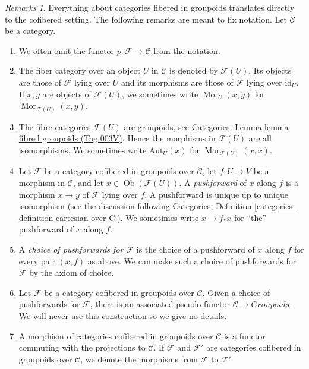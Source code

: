 \documentclass{amsart}
\theoremstyle{plain}
\theoremstyle{definition}
\theoremstyle{remark}
\newtheorem{remarks}[subsection]{Remarks}
\numberwithin{equation}{subsection}
\def\Mor{\mathop{\mathrm{Mor}}\nolimits}
\def\Ob{\mathop{\mathrm{Ob}}\nolimits}
\begin{document}
\begin{remarks}
\label{remarks-cofibered-groupoids}
Everything about categories fibered in groupoids translates directly to the
cofibered setting. The following remarks are meant to fix notation.
Let $\mathcal{C}$ be a category.
\begin{enumerate}
\item We often omit the functor $p: \mathcal{F} \to \mathcal{C}$ from the
notation.
\item The fiber category over an object $U$ in $\mathcal{C}$ is denoted by
$\mathcal{F}(U)$. Its objects are those of $\mathcal{F}$ lying over $U$ and its
morphisms are those of $\mathcal{F}$ lying over $\text{id}_U$.
If $x, y$  are objects of $\mathcal{F}(U)$, we sometimes write
$\Mor_U(x, y)$ for $\Mor_{\mathcal{F}(U)}(x, y)$.
\item The fibre categories $\mathcal{F}(U)$ are groupoids, see
Categories, Lemma \href{https://stacks.math.columbia.edu/tag/003V}{lemma fibred groupoids (Tag 003V)}.
Hence the morphisms in $\mathcal{F}(U)$ are all isomorphisms.
We sometimes write $\text{Aut}_U(x)$ for $\Mor_{\mathcal{F}(U)}(x, x)$.
\item
\label{item-pushforward}
Let $\mathcal{F}$ be a category cofibered in groupoids over
$\mathcal{C}$, let $f: U \to V$ be a morphism in $\mathcal{C}$, and
let $x \in \Ob(\mathcal{F}(U))$.
A {\it pushforward} of $x$ along $f$ is a morphism
$x \to y$ of $\mathcal{F}$ lying over $f$. A pushforward
is unique up to unique isomorphism (see the discussion following
Categories, Definition \ref{categories-definition-cartesian-over-C}).
We sometimes write $x \to f_*x$ for ``the'' pushforward of $x$
along $f$.
\item A {\it choice of pushforwards for $\mathcal{F}$} is the choice of
a pushforward of $x$ along $f$ for every pair $(x, f)$ as above. We can make
such a choice of pushforwards for $\mathcal{F}$ by the axiom of choice.
\item Let $\mathcal{F}$ be a category cofibered in groupoids over
$\mathcal{C}$. Given a choice of pushforwards for $\mathcal{F}$, there
is an associated pseudo-functor $\mathcal{C} \to \textit{Groupoids}$.
We will never use this construction so we give no details.
\item
\label{item-cofibered-morphism}
A morphism of categories cofibered in groupoids over $\mathcal{C}$ is a
functor commuting with the projections to $\mathcal{C}$. If $\mathcal{F}$
and $\mathcal{F}'$ are categories cofibered in groupoids over
$\mathcal{C}$, we denote the morphisms from $\mathcal{F}$ to $\mathcal{F}'$

\end{enumerate}
\end{remarks}
\end{document}

